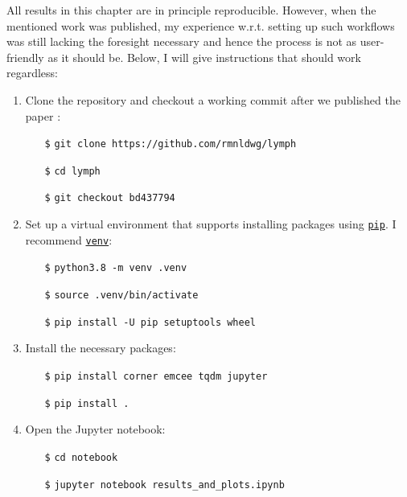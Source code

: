 \begin{tcolorbox}[title=\faIcon{recycle} Reproducibility, parbox=false]
    All results in this chapter are in principle reproducible. However, when the mentioned work \cite{ludwig_hidden_2021} was published, my experience w.r.t. setting up such workflows was still lacking the foresight necessary and hence the process is not as user-friendly as it should be. Below, I will give instructions that should work regardless:

    \begin{enumerate}
        \item Clone the  repository and checkout a working commit after we published the paper \cite{ludwig_hidden_2021}:
        \begin{itemize}[leftmargin=10mm]
            \setlength\itemsep{-0.5em}
            \item[\texttt{\$}] \verb|git clone https://github.com/rmnldwg/lymph|
            \item[\texttt{\$}] \verb|cd lymph|
            \item[\texttt{\$}] \verb|git checkout bd437794|
        \end{itemize}

        \item Set up a virtual environment that supports installing packages using \href{https://pypi.org/project/pip/}{\texttt{pip}}. I recommend \href{https://docs.python.org/3/library/venv.html}{\texttt{venv}}:
        \begin{itemize}[leftmargin=10mm]
            \setlength\itemsep{-0.5em}
            \item[\texttt{\$}] \verb|python3.8 -m venv .venv|
            \item[\texttt{\$}] \verb|source .venv/bin/activate|
            \item[\texttt{\$}] \verb|pip install -U pip setuptools wheel|
        \end{itemize}

        \item Install the necessary packages:
        \begin{itemize}[leftmargin=10mm]
            \setlength\itemsep{-0.5em}
            \item[\texttt{\$}] \verb|pip install corner emcee tqdm jupyter|
            \item[\texttt{\$}] \verb|pip install .|
        \end{itemize}

        \item Open the Jupyter notebook:
        \begin{itemize}[leftmargin=10mm]
            \setlength\itemsep{-0.5em}
            \item[\texttt{\$}] \verb|cd notebook|
            \item[\texttt{\$}] \verb|jupyter notebook results_and_plots.ipynb|
        \end{itemize}


\end{enumerate}
\end{tcolorbox}
